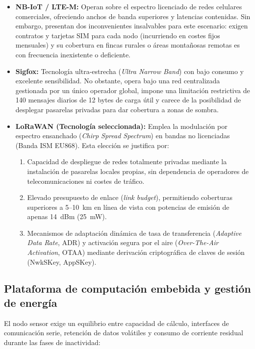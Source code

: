\begin{itemize}
    \item \textbf{NB-IoT / LTE-M:} Operan sobre el espectro licenciado de redes celulares comerciales, ofreciendo anchos de banda superiores y latencias contenidas. Sin embargo, presentan dos inconvenientes insalvables para este escenario: exigen contratos y tarjetas SIM para cada nodo (incurriendo en costes fijos mensuales) y su cobertura en fincas rurales o áreas montañosas remotas es con frecuencia inexistente o deficiente.

    \item \textbf{Sigfox:} Tecnología ultra-estrecha (\textit{Ultra Narrow Band}) con bajo consumo y excelente sensibilidad. No obstante, opera bajo una red centralizada gestionada por un único operador global, impone una limitación restrictiva de 140 mensajes diarios de 12 bytes de carga útil y carece de la posibilidad de desplegar pasarelas privadas para dar cobertura a zonas de sombra.

    \item \textbf{LoRaWAN (Tecnología seleccionada):} Emplea la modulación por espectro ensanchado (\textit{Chirp Spread Spectrum}) en bandas no licenciadas (Banda ISM EU868). Esta elección se justifica por:
    \begin{enumerate}
        \item Capacidad de despliegue de redes totalmente privadas mediante la instalación de pasarelas locales propias, sin dependencia de operadores de telecomunicaciones ni costes de tráfico.
        \item Elevado presupuesto de enlace (\textit{link budget}), permitiendo coberturas superiores a 5--10~km en línea de vista con potencias de emisión de apenas 14~dBm (25~mW).
        \item Mecanismos de adaptación dinámica de tasa de transferencia (\textit{Adaptive Data Rate}, ADR) y activación segura por el aire (\textit{Over-The-Air Activation}, OTAA) mediante derivación criptográfica de claves de sesión (NwkSKey, AppSKey).
    \end{enumerate}
\end{itemize}

\subsection{Plataforma de computación embebida y gestión de energía}

El nodo sensor exige un equilibrio entre capacidad de cálculo, interfaces de comunicación serie, retención de datos volátiles y consumo de corriente residual durante las fases de inactividad:

